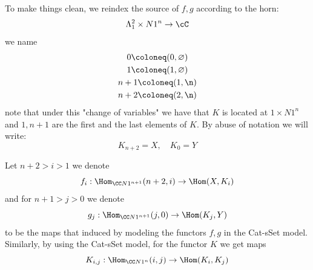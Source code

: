 To make things clean, we reindex the source of $f,g$ according to the horn:
\[
    \Lambda^2_1 \times N 1^n \to \cC
\]
we name
\begin{gather*}
    0 \coloneq (0,\varnothing) \\
    1 \coloneq (1,\varnothing) \\
    n+1 \coloneq (1, \n) \\
    n+2 \coloneq (2,\n) 
\end{gather*}
note that under this "change of variables" we have that $K$ is located at ${1} \times N 1^n$ and  $1, n+1$ are the first and the last elements of $K$. By abuse of notation we will write:
\[
    K_{n+2} = X, \quad K_0 = Y
\]

Let $n+2 > i > 1$ we denote
\[
     f_i : \Hom_{\CC N 1^{n+1}}(n+2,i) \to \Hom(X,K_i)
\]
and for $n+1 > j > 0$ we denote
\[
    g_j: \Hom_{\CC N 1^{n+1}}(j,0) \to \Hom(K_j,Y)
\]
to be the maps that induced by modeling the functors $f,g$ in the Cat-sSet model.
Similarly, by using the Cat-sSet model, for the functor $K$ we get maps
\[
    K_{i,j} : \Hom_{\CC N 1^n}(i,j) \to \Hom(K_i,K_j)
\]
